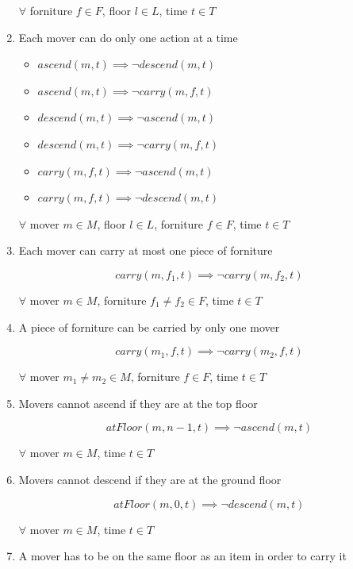 \documentclass[a4paper, 11pt]{article}
\begin{document}
\begin{enumerate}
	      $\forall$ forniture $f \in F$, floor $l \in L$, time $t \in T$

	\item Each mover can do only one action at a time

	      \begin{itemize}
		      \item $ascend(m, t) \implies \lnot descend(m, t)$
		      \item $ascend(m, t) \implies \lnot carry(m, f, t)$
		      \item $descend(m, t) \implies \lnot ascend(m, t)$
		      \item $descend(m, t) \implies \lnot carry(m, f, t)$
		      \item $carry(m, f, t) \implies \lnot ascend(m, t)$
		      \item $carry(m, f, t) \implies \lnot descend(m, t)$
	      \end{itemize}

	      $\forall$ mover $m \in M$, floor $l \in L$, forniture $f \in F$, time $t \in T$

	\item Each mover can carry at most one piece of forniture

	      $$ carry(m, f_1, t) \implies \lnot carry(m, f_2, t)$$

	      $\forall$ mover $m\in M$, forniture $f_1 \neq f_2 \in F$, time $t \in T$

	\item A piece of forniture can be carried by only one mover

	      $$ carry(m_1, f, t) \implies \lnot carry(m_2, f, t)$$

	      $\forall$ mover $m_1 \neq m_2 \in M$, forniture $f\in F$, time $t \in T$

	\item Movers cannot ascend if they are at the top floor

	      $$atFloor(m, n-1, t) \implies \lnot ascend(m, t)$$

	      $\forall$ mover $m \in M$, time $t \in T$

	\item Movers cannot descend if they are at the ground floor

	      $$atFloor(m, 0, t) \implies \lnot descend(m, t)$$

	      $\forall$ mover $m \in M$, time $t \in T$

	\item A mover has to be on the same floor as an item in order to carry it


\end{enumerate}
\end{document}
